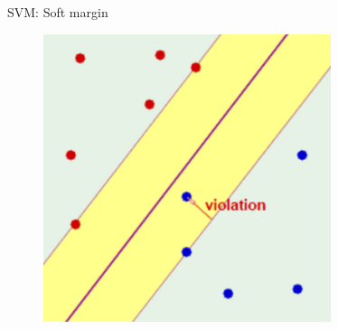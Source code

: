 \documentclass{beamer}
\begin{document}
\begin{frame}{SVM: Soft margin}
\begin{figure}
\centering
\includegraphics[width=0.75\textwidth]{images/soft_margin.png}
\end{figure}
\end{frame}
\end{document}
